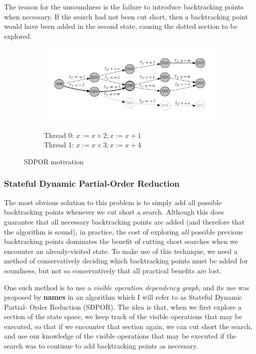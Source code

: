 \documentclass[12pt,a4paper,twoside,openright]{report}
\begin{document}
The reason for the unsoundness is the failure to
introduce backtracking points when necessary. If the
search had not been cut short, then a backtracking point
would have been added in the second state, causing the
dotted section to be explored.

\begin{figure}
	\begin{subfigure}{\textwidth}
		\includegraphics[width=\textwidth]{sdpor}
	\end{subfigure}
	\begin{subfigure}{\textwidth}
		Thread 0: $x := x \times 2; x := x + 1$ \\
		Thread 1: $x := x \times 3; x := x + 4$
	\end{subfigure}
	\caption{SDPOR motivation}
	\label{fig:sdpor-motivation}
\end{figure}




\subsubsection{Stateful Dynamic Partial-Order Reduction}
The most obvious solution to this problem is to simply
add all possible backtracking points whenever we cut
short a search. Although this does guarantee that all
necessary backtracking points are added (and therefore
that the algorithm is sound), in practice, the cost
of exploring \emph{all} possible previous backtracking points
dominates the benefit of cutting short searches when we
encounter an already-visited state. To make use of this
technique, we need a method of conservatively deciding which
backtracking points must be added for soundness, but not
so conservatively that all practical benefits are lost.

One such method is to use a \emph{visible operation dependency
graph}, and its use was proposed by \textbf{names} in an
algorithm which I will refer to as Stateful Dynamic Partial-
Order Reduction (SDPOR). The idea is that, when we first explore
a section of the state space, we keep track of the visible operations
that may be executed, so that if we encounter that section again,
we can cut short the search, and use our knowledge of the
visible operations that may be executed if the search was
to continue to add backtracking points as necessary.
\end{document}
